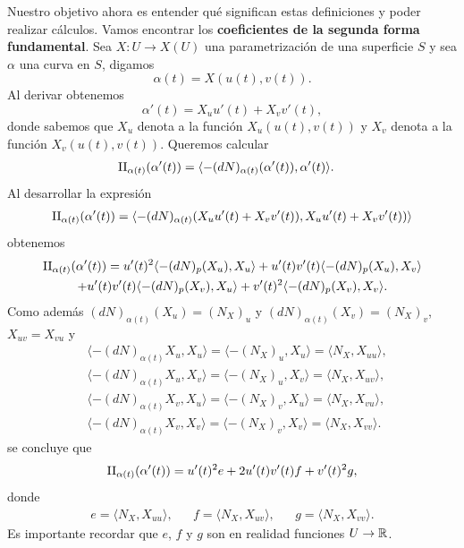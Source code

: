 \medskip
{}
Nuestro objetivo ahora es entender qué significan estas definiciones 
y poder realizar cálculos. 
Vamos encontrar los \textbf{coeficientes de la segunda forma fundamental}. 
Sea $X\colon U\to X(U)$ una parametrización de una superficie $S$ y  
sea $\alpha$ una curva en $S$, digamos
\[
	\alpha(t)=X(u(t),v(t)).
\]
Al derivar obtenemos
\[
	\alpha'(t)=X_uu'(t)+X_vv'(t),
\]
donde sabemos que $X_u$ denota a la función $X_u(u(t),v(t))$ y $X_v$ denota a
la función $X_v(u(t),v(t))$. Queremos calcular
\begin{align*}
	\operatorname{II}_{\alpha(t)}(\alpha'(t))&=\langle -(dN)_{\alpha(t)}(\alpha'(t)),\alpha'(t)\rangle.
\end{align*}
Al desarrollar la expresión 
\begin{align*}
	\operatorname{II}_{\alpha(t)}(\alpha'(t))=\langle -(dN)_{\alpha(t)}(X_uu'(t)+X_vv'(t)),X_uu'(t)+X_vv'(t))\rangle
\end{align*}
obtenemos
\begin{multline*}
	\operatorname{II}_{\alpha(t)}(\alpha'(t))=u'(t)^2\langle -(dN)_p(X_u),X_u\rangle
	+u'(t)v'(t)\langle -(dN)_p(X_u),X_v\rangle\\
	+u'(t)v'(t)\langle -(dN)_p(X_v),X_u\rangle
	+v'(t)^2\langle -(dN)_p(X_v),X_v\rangle.
\end{multline*}
Como además $(dN)_{\alpha(t)}(X_u)=(N_X)_{u}$ y $(dN)_{\alpha(t)}(X_v)=(N_X)_v$, $X_{uv}=X_{vu}$ y 
\begin{align*}
	&\langle -(dN)_{\alpha(t)}X_u,X_u\rangle=\langle -(N_X)_u,X_u\rangle=\langle N_X,X_{uu}\rangle,\\
	&\langle -(dN)_{\alpha(t)}X_u,X_v\rangle=\langle -(N_X)_u,X_v\rangle=\langle N_X,X_{uv}\rangle,\\
	&\langle -(dN)_{\alpha(t)}X_v,X_u\rangle=\langle -(N_X)_v,X_u\rangle=\langle N_X,X_{vu}\rangle,\\
	&\langle -(dN)_{\alpha(t)}X_v,X_v\rangle=\langle -(N_X)_v,X_v\rangle=\langle N_X,X_{vv}\rangle.
\end{align*}
se concluye que 
\[
	\operatorname{II}_{\alpha(t)}(\alpha'(t))=u'(t)^2e+2u'(t)v'(t)f+v'(t)^2g,
\]
donde
\begin{align*}
	e=\langle N_X, X_{uu}\rangle, && 
	f=\langle N_X, X_{uv}\rangle, &&
	g=\langle N_X, X_{vv}\rangle.
\end{align*}
Es importante recordar que $e$, $f$ y $g$ son en realidad funciones $U\to\mathbb{R}$. 

